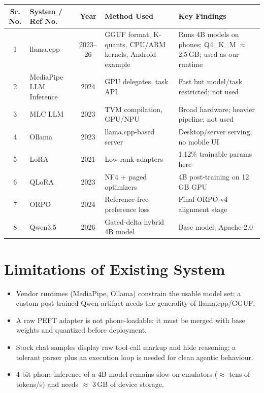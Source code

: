 \documentclass[12pt,a4paper]{report}
\begin{document}
\renewcommand{\arraystretch}{1.6} %

\begin{tabular}{|c|p{4.5cm}|c|p{3.5cm}|p{4.5cm}|}
\hline
\textbf{Sr. No.} & \textbf{System / Ref No.} & \textbf{Year} & \textbf{Method Used} & \textbf{Key Findings} \\
\hline

1 & llama.cpp \cite{R1} & 2023--26 & GGUF format, K-quants, CPU/ARM kernels, Android example & Runs 4B models on phones; Q4\_K\_M $\approx$ 2.5\,GB; used as our runtime \\ \hline
2 & MediaPipe LLM Inference \cite{R2} & 2024 & GPU delegates, task API & Fast but model/task restricted; not used \\ \hline
3 & MLC LLM \cite{R3} & 2023 & TVM compilation, GPU/NPU & Broad hardware; heavier pipeline; not used \\ \hline
4 & Ollama \cite{R4} & 2023 & llama.cpp-based server & Desktop/server serving; no mobile UI \\ \hline
5 & LoRA \cite{R5} & 2021 & Low-rank adapters & 1.12\% trainable params here \\ \hline
6 & QLoRA \cite{R6} & 2023 & NF4 + paged optimizers & 4B post-training on 12\,GB GPU \\ \hline
7 & ORPO \cite{R7} & 2024 & Reference-free preference loss & Final ORPO-v4 alignment stage \\ \hline
8 & Qwen3.5 \cite{R8} & 2026 & Gated-delta hybrid 4B model & Base model; Apache-2.0 \\ \hline

\end{tabular}
\section{Limitations of Existing System}
\begin{itemize}
    \item Vendor runtimes (MediaPipe, Ollama) constrain the usable model set; a custom post-trained Qwen artifact needs the generality of llama.cpp/GGUF.
    \item A raw PEFT adapter is not phone-loadable: it must be merged with base weights and quantized before deployment.
    \item Stock chat samples display raw tool-call markup and hide reasoning; a tolerant parser plus an execution loop is needed for clean agentic behaviour.
    \item 4-bit phone inference of a 4B model remains slow on emulators ($\approx$ tens of tokens/s) and needs $\approx$ 3\,GB of device storage.
\end{itemize}
\end{document}
